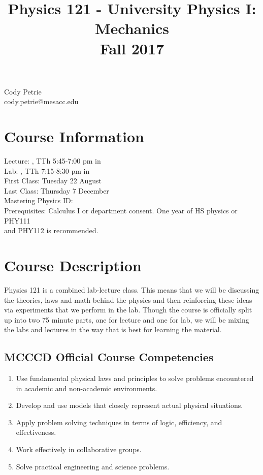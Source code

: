 \documentclass[12pt]{article}
\title{Physics 121 - University Physics I: Mechanics \\ Fall 2017 \vspace{-2cm}}
\date{}
\newcommand{\red}[1]{{\color{red}{#1}}}
\newcommand{\tabc}{4.3cm} %
\begin{document}
\maketitle

\begin{center}
Cody Petrie \\ cody.petrie@mesacc.edu
\end{center}

\section*{Course Information}
Lecture: \tabto{\tabc} \red{Section 17904}, TTh 5:45-7:00 pm in \red{room} \\
Lab: \tabto{\tabc} \red{Section 17904}, TTh 7:15-8:30 pm in \red{room} \\
First Class: \tabto{\tabc} Tuesday 22 August \\
Last Class: \tabto{\tabc} Thursday 7 December \\
Mastering Physics ID: \tabto{\tabc} \red{ID here} \\
Prerequisites: \tabto{\tabc} Calculus I or department consent. One year of HS physics or PHY111 \\ and PHY112 is recommended.

\section*{Course Description}
Physics 121 is a combined lab-lecture class. This means that we will be discussing the theories, laws and math behind the physics and then reinforcing these ideas via experiments that we perform in the lab. Though the course is officially split up into two 75 minute parts, one for lecture and one for lab, we will be mixing the labs and lectures in the way that is best for learning the material.

\subsection*{MCCCD Official Course Competencies}
\begin{enumerate}
   \item Use fundamental physical laws and principles to solve problems encountered in academic and non-academic environments.
   \item Develop and use models that closely represent actual physical situations.
   \item Apply problem solving techniques in terms of logic, efficiency, and effectiveness.
   \item Work effectively in collaborative groups.
   \item Solve practical engineering and science problems.
\end{enumerate}
\end{document}
